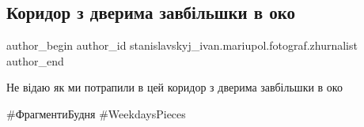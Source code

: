  
 
 
 
 

\subsection{Коридор з дверима завбільшки в око}
\label{sec:19_01_2022.fb.stanislavskyj_ivan.mariupol.fotograf.zhurnalist.1.koridor_dveri_oko}

\ifcmt
 author_begin
   author_id stanislavskyj_ivan.mariupol.fotograf.zhurnalist
 author_end
\fi

Не відаю як ми потрапили в цей коридор з дверима завбільшки в око

\#ФрагментиБудня \#WeekdaysPieces
